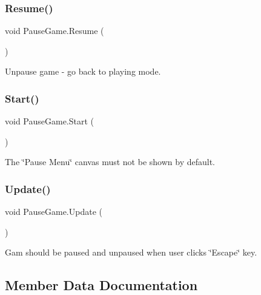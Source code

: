 \subsubsection{\texorpdfstring{Resume()}{Resume()}}
{\footnotesize\ttfamily void Pause\+Game.\+Resume (\begin{DoxyParamCaption}{ }\end{DoxyParamCaption})}



Unpause game -\/ go back to playing mode. 

\mbox{\label{class_pause_game_ad8c1d801b6da90aee58fdd8b0b2f2b97}} 
\subsubsection{\texorpdfstring{Start()}{Start()}}
{\footnotesize\ttfamily void Pause\+Game.\+Start (\begin{DoxyParamCaption}{ }\end{DoxyParamCaption})\hspace{0.3cm}{\ttfamily [private]}}



The \char`\"{}\+Pause Menu\char`\"{} canvas must not be shown by default. 

\mbox{\label{class_pause_game_ab0e714ec7b02d822c8491abba21d55fb}} 
\subsubsection{\texorpdfstring{Update()}{Update()}}
{\footnotesize\ttfamily void Pause\+Game.\+Update (\begin{DoxyParamCaption}{ }\end{DoxyParamCaption})\hspace{0.3cm}{\ttfamily [private]}}



Gam should be paused and unpaused when user clicks \char`\"{}\+Escape\char`\"{} key. 



\subsection{Member Data Documentation}
\mbox{\label{class_pause_game_adf677814c2492d0887efd5ea18e6bba4}} 
